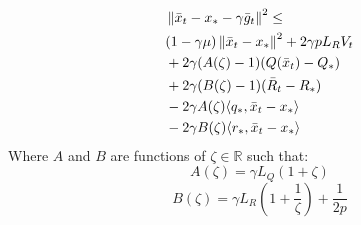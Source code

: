 \begin{lemma}\label{lem:AB-lemma}
    \begin{align}
    \begin{split}
        &\left\|\bar{x}_t - x_* - \gamma \bar{g}_t\right\|^2 \leq \\
        &(1 - \gamma \mu)\left\|\bar{x}_t - x_*\right\|^2 + 2 \gamma p L_R V_t \\
        &+ 2\gamma (A(\zeta) - 1)(Q(\bar{x}_t) - Q_*) \\
        &+ 2\gamma (B(\zeta) - 1)(\bar{R}_t - R_*) \\
        &- 2\gamma A(\zeta) \langle q_*, \bar{x}_t - x_*\rangle \\
        &- 2\gamma B(\zeta) \langle r_*, \bar{x}_t - x_*\rangle
    \end{split}
\end{align}
Where $A$ and $B$ are functions of $\zeta \in \mathbb{R}$ such that:
\[A(\zeta) = \gamma L_Q(1+\zeta)\] 
\[B(\zeta) = \gamma L_R(1+\frac{1}{\zeta}) + \frac{1}{2p}\]

\end{lemma}
